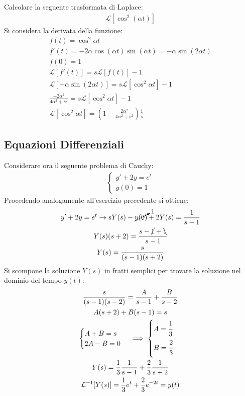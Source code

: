 \documentclass{article}
\numberwithin{equation}{subsection}
\begin{document}
Calcolare la seguente trasformata di Laplace:
\begin{gather*}
    \mathcal{L}[\cos^2(\alpha t)]
\end{gather*}
Si considera la derivata della funzione:
\begin{gather*}
    f(t)=\cos^2\alpha t\\
    f'(t)=-2\alpha\cos(\alpha t)\sin(\alpha t)=-\alpha\sin(2\alpha t)\\
    f(0)=1\\
    \mathcal{L}[f'(t)]=s\mathcal{L}[f(t)]-1\\
    \mathcal{L}[-\alpha\sin(2\alpha t)]=s\mathcal{L}[\cos^2\alpha t]-1\\
    \frac{-2\alpha^2}{4\alpha^2+s^2}=s\mathcal{L}[\cos^2\alpha t]-1\\
    \mathcal{L}[\cos^2\alpha t]=\left(1-\frac{2\alpha^2}{4\alpha^2+s^2}\right)\frac{1}{s}
\end{gather*}

\subsection{Equazioni Differenziali}

Considerare ora il seguente problema di Cauchy:
\begin{gather*}
    \begin{cases}
        y'+2y=e^t\\
        y(0)=1
    \end{cases}
\end{gather*}
Procedendo analogamente all'esercizio precedente si ottiene:
\begin{gather*}
    y'+2y=e^t\to sY(s)-\cancelto{1}{y(0)}+2Y(s)=\frac{1}{s-1}\\
    Y(s)(s+2)=\frac{s-\cancel{1}+\bcancel{1}}{s-1}\\
    Y(s)=\frac{s}{(s-1)(s+2)}
\end{gather*}
Si scompone la soluzione $Y(s)$ in fratti semplici per trovare la soluzione nel dominio del tempo $y(t)$:
\begin{gather*}
    \frac{s}{(s-1)(s-2)}=\frac{A}{s-1}+\frac{B}{s-2}\\
    A(s+2)+B(s-1)=s\\
    \begin{cases}
        A+B=s\\
        2A-B=0
    \end{cases}\implies\begin{cases}
        A=\displaystyle\frac{\strut1}{\strut3}\\
        B=\displaystyle\frac{\strut2}{\strut3}
    \end{cases}\\
    Y(s)=\frac{1}{3}\frac{1}{s-1}+\frac{2}{3}\frac{1}{s+2}\\
    \mathcal{L}^{-1}[Y(s)]=\frac{1}{3}e^{t}+\frac{2}{3}e^{-2t}=y(t)
\end{gather*}
\end{document}

